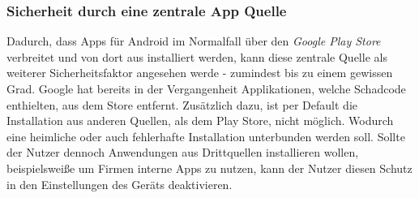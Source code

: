 	\subsubsection{Sicherheit durch eine zentrale App Quelle}
	Dadurch, dass Apps für Android im Normalfall über den \textit{Google Play Store} verbreitet und von dort aus installiert werden, kann diese zentrale Quelle als weiterer Sicherheitsfaktor angesehen werde - zumindest bis zu einem gewissen Grad. Google hat bereits in der Vergangenheit Applikationen, welche Schadcode enthielten, aus dem Store entfernt. Zusätzlich dazu, ist per Default die Installation aus anderen Quellen, als dem Play Store, nicht möglich. Wodurch eine heimliche oder auch fehlerhafte Installation unterbunden werden soll. Sollte der Nutzer dennoch Anwendungen aus Drittquellen installieren wollen, beispielsweiße um Firmen interne Apps zu nutzen, kann der Nutzer diesen Schutz in den Einstellungen des Geräts deaktivieren.